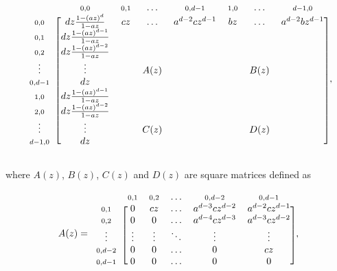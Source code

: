\documentclass{article}
\begin{document}
\begin{equation*}
\begin{blockarray}{cccccccc}
   & \scriptstyle{0,0} & \scriptstyle{0,1} & 
    \ldots & \scriptstyle{0,d-1} &
    \scriptstyle{1,0} & \ldots &
    \scriptstyle{d-1,0}\\
\begin{block}{c[ccccccc]}
\scriptstyle{0,0} & dz\frac{1-(az)^d}{1-az}  & cz & \ldots &
    a^{d-2}cz^{d-1} & bz & \ldots & a^{d-2}bz^{d-1} \\
\scriptstyle{0,1} & dz\frac{1-(az)^{d-1}}{1-az} \\
\scriptstyle{0,2} & dz\frac{1-(az)^{d-2}}{1-az} \\
\vdots & \vdots & & A(z) & & & B(z) \\
\scriptstyle{0,d-1} & dz \\
\scriptstyle{1,0} & dz\frac{1-(az)^{d-1}}{1-az} \\
\scriptstyle{2,0} & dz\frac{1-(az)^{d-2}}{1-az} \\
\vdots & \vdots & & C(z) & & & D(z) \\
\scriptstyle{d-1,0} & dz \\
\end{block}
\end{blockarray},
\end{equation*}

\noindent
where $A(z)$, $B(z)$, $C(z)$ and $D(z)$ are square matrices defined as

\begin{equation*}
A(z) = 
\begin{blockarray}{cccccc}
   & \scriptstyle{0,1} & \scriptstyle{0,2} & \ldots &
    \scriptstyle{0,d-2} & \scriptstyle{0,d-1} \\
\begin{block}{c[ccccc]}
\scriptstyle{0,1} & 0 & cz & \ldots &
    a^{d-3}cz^{d-2} & a^{d-2}cz^{d-1} \\
\scriptstyle{0,2} & 0 & 0 & \ldots &
    a^{d-4}cz^{d-3} & a^{d-3}cz^{d-2} \\
\vdots & \vdots & \vdots & \ddots & \vdots & \vdots \\
\scriptstyle{0,d-2} & 0 & 0 & \ldots & 0 & cz \\
\scriptstyle{0,d-1} & 0 & 0 & \ldots & 0 & 0 \\
\end{block}
\end{blockarray},
\end{equation*}
\end{document}
